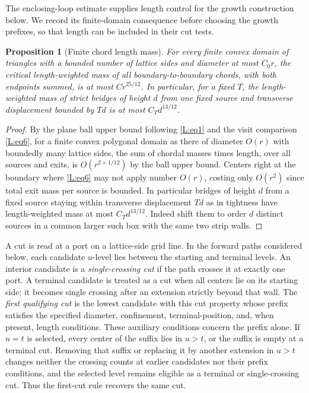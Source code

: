 \documentclass[11pt]{article}
\numberwithin{equation}{section}
\newtheorem{proposition}[theorem]{Proposition}
\theoremstyle{definition}\newtheorem{definition}[theorem]{Definition}
\theoremstyle{remark}\newtheorem{remark}[theorem]{Remark}
\begin{document}
The enclosing-loop estimate supplies length control for the growth
construction below. We record its finite-domain consequence before choosing
the growth prefixes, so that length can be included in their cut tests.

\begin{proposition}[Finite chord length mass]\label{L:prop:box-moment}
For every finite convex domain of triangles with a bounded number of
lattice sides and diameter at most $C_0r$, the critical length-weighted
mass of all boundary-to-boundary chords, with both endpoints summed, is
at most $C r^{25/12}$. In particular, for a fixed $T$, the length-weighted
mass of strict bridges of height $d$ from one fixed source and transverse
displacement bounded by $Td$ is at most $C_Td^{13/12}$.
\end{proposition}
\begin{proof}
By the plane ball upper bound following \eqref{L:eq1} and the visit comparison \eqref{L:eq6}, for a finite convex polygonal domain as there of diameter \(O(r)\) with boundedly many lattice sides, the sum of chordal masses times length, over all sources and exits, is \(O(r^{2+1/12})\) by the ball upper bound. Centers right at the boundary where \eqref{L:eq6} may not apply number \(O(r)\), costing only \(O(r^2)\) since total exit mass per source is bounded. In particular bridges of height \(d\) from a fixed source staying within transverse displacement \(Td\) as in tightness have length-weighted mass at most \(C_T d^{13/12}\). Indeed shift them to order \(d\) distinct sources in a common larger such box with the same two strip walls.
\end{proof}

A cut is read at a port on a lattice-side grid line. In the forward
paths considered below, each candidate \(u\)-level lies between the
starting and terminal levels. An interior candidate is a
\emph{single-crossing cut} if the path crosses it at exactly one port.
A terminal candidate is treated as a cut when all centers lie on its
starting side; it becomes single crossing after an extension strictly
beyond that wall. The \emph{first qualifying cut} is the lowest candidate
with this cut property whose prefix satisfies the specified diameter,
confinement, terminal-position, and, when present, length conditions.
These auxiliary conditions concern the prefix alone. If \(u=t\) is
selected, every center of the suffix lies in \(u>t\), or the suffix is
empty at a terminal cut. Removing that suffix or replacing it by another
extension in \(u>t\) changes neither the crossing counts at earlier
candidates nor their prefix conditions, and the selected level remains
eligible as a terminal or single-crossing cut. Thus the first-cut rule
recovers the same cut.
\end{document}
